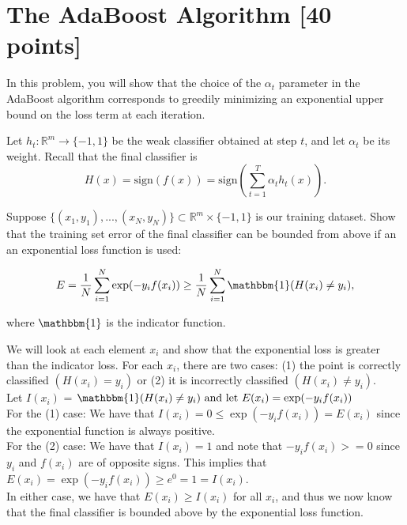
\newpage
\section{The AdaBoost Algorithm [40 points]}

In this problem, you will show that the choice of the $\alpha_t$ parameter in
the AdaBoost algorithm corresponds to greedily minimizing an exponential upper
bound on the loss term at each iteration.

\problem[3]
Let $h_t: \mathbb{R}^m \rightarrow \{-1,1\}$ be the weak classifier obtained at step $t$, and let $\alpha_t$ be
its weight. Recall that the final classifier is $$H(x) = \text{sign}(f(x)) = \text{sign} \left(\sum\limits_{t=1}^T \alpha_{t}h_t(x) \right).$$

Suppose $\{(x_1, y_1), ..., (x_N, y_N)\} \subset \mathbb{R}^m \times \{-1,1\}$ is our training dataset.  Show that the training set error of the final classifier can be bounded from
above if an an exponential loss function is used:

$$E = \frac{1}{N} \sum\limits_{i=1}^N \exp(-y_{i}f(x_i)) \geq \frac{1}{N} \sum\limits_{i=1}^N \mathbbm{1}(H(x_i) \neq y_i),$$

where $\mathbbm{1}$ is the indicator function.

\begin{solution}
    We will look at each element $x_i$ and show that the exponential loss is greater than the indicator loss. For each $x_i$, there are two cases: (1) the point is correctly classified $(H(x_i) = y_i)$ or (2) it is incorrectly classified $(H(x_i) \neq y_i)$. \\
    Let $I(x_i)$ = $\mathbbm{1}(H(x_i) \neq y_i)
    \text{ and let } E(x_i) = \exp(-y_{i}f(x_i))$ \\
    For the (1) case: We have that $I(x_i) = 0 \leq \exp(-y_{i}f(x_i)) = E(x_i)$ since the exponential function is always positive. \\
    For the (2) case: We have that $I(x_i) = 1$ and note that $-y_{i}f(x_i) >= 0$ since $y_{i}$ and $f(x_i)$ are of opposite signs. This implies that $E(x_i) = \exp(-y_{i}f(x_i)) \geq e^0 = 1 = I(x_i)$. \\
    In either case, we have that $E(x_i) \geq I(x_i)$ for all $x_i$, and thus we now know that the final classifier is bounded above by the exponential loss function. 
\end{solution}

